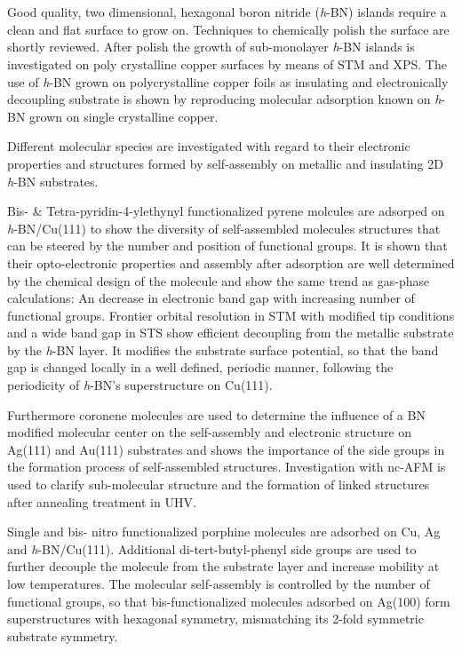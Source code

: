 \chapter{\abstractname}
Good quality, two dimensional, hexagonal boron nitride (\textit{h}-BN) islands require a clean and flat surface to grow on. Techniques to chemically polish the surface are shortly reviewed. After polish the growth of sub-monolayer \textit{h}-BN islands is investigated on poly crystalline copper surfaces by means of STM and XPS. The use of \textit{h}-BN grown on polycrystalline copper foils as insulating and electronically decoupling substrate is shown by reproducing molecular adsorption known on \textit{h}-BN grown on single crystalline copper.

Different molecular species are investigated with regard to their electronic properties and structures formed by self-assembly on metallic and insulating 2D \textit{h}-BN substrates.

Bis- \& Tetra-pyridin-4-ylethynyl functionalized pyrene molcules are adsorped on \textit{h}-BN/Cu(111) to show the diversity of self-assembled molecules structures that can be steered by the number and position of functional groups. It is shown that their opto-electronic properties and assembly after adsorption are well determined by the chemical design of the molecule and show the same trend as gas-phase calculations: An decrease in electronic band gap with increasing number of functional groups. Frontier orbital resolution in STM with modified tip conditions and a wide band gap in STS show efficient decoupling from the metallic substrate by the \textit{h}-BN layer. It modifies the substrate surface potential, so that the band gap is changed locally in a well defined, periodic manner, following the periodicity of \textit{h}-BN's superstructure on Cu(111).

Furthermore coronene molecules are used to determine the influence of a BN modified molecular center on the self-assembly and electronic structure on Ag(111) and Au(111) substrates and shows the importance of the side groups in the formation process of self-assembled structures. Investigation with nc-AFM is used to clarify sub-molecular structure and the formation of linked structures after annealing treatment in UHV.

Single and bis- nitro functionalized porphine molecules are adsorbed on Cu, Ag and \textit{h}-BN/Cu(111). Additional di-tert-butyl-phenyl side groups are used to further decouple the molecule from the substrate layer and increase mobility at low temperatures. The molecular self-assembly is controlled by the number of functional groups, so that bis-functionalized molecules adsorbed on Ag(100) form superstructures with hexagonal symmetry, mismatching its 2-fold symmetric substrate symmetry.
	
